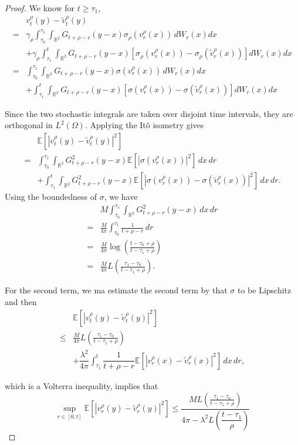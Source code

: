 \begin{proof}

We know for $t\geq\tau_1$,
\begin{align*}
&v_t^\rho(y)-\widetilde v_t^\rho(y)
\\
={}&
\gamma_\rho
\int_{\tau_0}^{\tau_1}
\int_{\mathbb{R}^2}
G_{t+\rho-r}(y-x)
\sigma_\rho(v_r^\rho(x))
\,dW_r(x)dx
\\
&+
\gamma_\rho
\int_{\tau_1}^{t}
\int_{\mathbb{R}^2}
G_{t+\rho-r}(y-x)
\left[
\sigma_\rho(v_r^\rho(x))
-
\sigma_\rho(\widetilde v_r^\rho(x))
\right]
dW_r(x)dx \\
={}&
\int_{\tau_0}^{\tau_1}
\int_{\mathbb{R}^2}
G_{t+\rho-r}(y-x)
\sigma(v_r^\rho(x))
\,dW_r(x)dx
\\
&+
\int_{\tau_1}^{t}
\int_{\mathbb{R}^2}
G_{t+\rho-r}(y-x)
\left[
\sigma(v_r^\rho(x))
-
\sigma(\widetilde v_r^\rho(x))
\right]
dW_r(x)dx
\end{align*}

Since the two stochastic integrals are taken
over disjoint time intervals, they are orthogonal
in $L^2(\Omega)$. Applying the It\^o isometry gives
\begin{align*}
&\mathbb{E}
\left[
|v_t^\rho(y)-\widetilde v_t^\rho(y)|^2
\right]
\nonumber\\
={}&
\int_{\tau_0}^{\tau_1}
\int_{\mathbb{R}^2}
G_{t+\rho-r}^2(y-x)
\mathbb{E}
\left[
|\sigma(v_r^\rho(x))|^2
\right]
\,dx\,dr
\nonumber\\
&+
\int_{\tau_1}^{t}
\int_{\mathbb{R}^2}
G_{t+\rho-r}^2(y-x)
\mathbb{E}
\left[
\left|
\sigma(v_r^\rho(x))
-
\sigma(\widetilde v_r^\rho(x))
\right|^2
\right]
\,dx\,dr.
\end{align*}
Using the boundedness of $\sigma$,
we have
\begin{align*}
&M
\int_{\tau_0}^{\tau_1}
\int_{\mathbb{R}^2}
G_{t+\rho-r}^2(y-x)
\,dx\,dr
\\
={}&
\frac{M}{4\pi}
\int_{\tau_0}^{\tau_1}
\frac{1}{t+\rho-r}\,dr
\\
={}&
\frac{M}{4\pi}
\log\left(
\frac{t-\tau_0+\rho}
{t-\tau_1+\rho}
\right)
\\
={}&
\frac{M}{4\pi}
L\left(
\frac{\tau_1-\tau_0}
{t-\tau_1+\rho}
\right).
\end{align*}

For the second term,
we ma estimate the second term
by that $\sigma$ to be Lipschitz and then
\begin{align*}
&\mathbb{E}
\left[
|v_t^\rho(y)-\widetilde v_t^\rho(y)|^2
\right]
\nonumber\\
\leq{}&
\frac{M}{4\pi}
L\left(
\frac{\tau_1-\tau_0}
{t-\tau_1+\rho}
\right)
\nonumber\\
&+
\dfrac{\lambda^2}{4\pi} \int_{\tau_1}^{t}
\dfrac{1}{t+\rho-r}\mathbb{E}
\left[
\left|v_r^\rho(x)
-
\widetilde v_r^\rho(x)
\right|^2
\right]
\,dx\,dr,
\end{align*}

which is a Volterra inequality, implies that
\[
\sup_{r \in [0,t]}\mathbb{E}
\left[
|v_r^\rho(y)-\widetilde v_r^\rho(y)|^2
\right] \leq \dfrac{ML\left(
\frac{\tau_1-\tau_0}
{t-\tau_1+\rho}
\right)}{4\pi - \lambda^2 L\left(\dfrac{t-\tau_1}{\rho}\right)}
\]

\end{proof}

